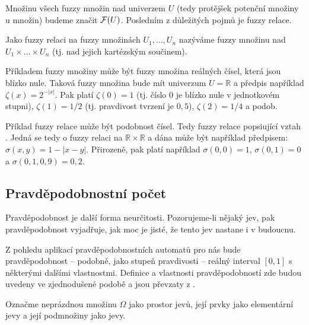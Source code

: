 \documentclass[a4paper,10pt]{article}
\begin{document}
Množinu všech fuzzy množin nad univerzem $U$ (tedy protějšek potenční množiny u  množin) budeme značit $\mathcal{F}(U)$. Posledním z důležitých pojmů je fuzzy relace.

\begin{definition}
 Jako fuzzy relaci na fuzzy množinách $U_1, \dots, U_n$ nazýváme fuzzy množinu nad $U_1 \times \dots \times U_n$ (tj. nad jejich kartézským součinem).
\end{definition}


\begin{example}
  Příkladem fuzzy množiny může být fuzzy množina reálných čísel, která jsou blízko nule. Taková fuzzy množina bude mít univerzum $U = \mathbb
  {R}$ a předpis například $\zeta(x) = 2^{-|x|}$. Pak platí $\zeta(0) = 1$ (tj. číslo $0$ je blízko nule v jednotkovém stupni), $\zeta(1) = 1/2$ (tj. pravdivost tvrzení  je $0{,}5$), $\zeta(2) = 1/4$ a podob.
  
  Příklad fuzzy relace může být podobnost čísel. Tedy fuzzy relace popsiující vztah . Jedná se tedy o fuzzy relaci na $\mathbb{R} \times \mathbb{R}$ a dána může být například předpisem: $\sigma(x, y) = 1 - |x - y|$. Přirozeně, pak platí například $\sigma(0, 0) = 1$, $\sigma(0, 1) = 0$ a $\sigma(0{,}1, 0{,}9) = 0{,}2$.
\end{example}

\subsection{Pravděpodobnostní počet}
Pravděpodobnost je další forma neurčitosti. Pozorujeme-li nějaký jev, pak pravděpodobnost vyjadřuje, jak moc je jisté, že tento jev nastane i v budoucnu. 

Z pohledu aplikací pravděpodobnostních automatů pro nás bude pravděpodobnost -- podobně, jako stupeň pravdivosti -- reálný interval $[0, 1]$ s některými dalšími vlastnostmi. Definice a vlastnosti pravděpodobností zde budou uvedeny ve zjednodušené podobě a jsou převzaty z \cite{Joh-ProbStaComSci}. 

\begin{definition}
  Označme neprázdnou množinu $\Omega$ jako prostor jevů, její prvky jako elementární jevy a její podmnožiny jako jevy.  
\end{definition}
\end{document}

